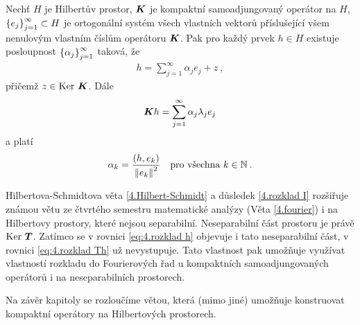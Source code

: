 \begin{corollary} \label{4.rozklad I}
Nechť $H$ je Hilbertův prostor, $\boldsymbol{K}$ je kompaktní samoadjungovaný operátor na $H$, $\left \lbrace e_j \right \rbrace_{j=1}^\infty \subset H$ je ortogonální systém všech vlastních vektorů příslušející všem nenulovým vlastním číslům operátoru $\boldsymbol{K}$. Pak pro každý prvek $h \in H$ existuje posloupnost $\left \lbrace \alpha_j \right \rbrace_{j=1}^\infty$ taková, že \begin{align} \label{eq:4.rozklad h}
    h = \sum_{j=1}^\infty \alpha_j e_j + z \:,
\end{align}
přičemž $z \in \operatorname{Ker}\, \boldsymbol{K}$. Dále \begin{align} \label{eq:4.rozklad Th}
    \boldsymbol{K} h = \sum_{j=1}^\infty \alpha_j \lambda_j e_j
\end{align}
a platí \begin{align*}
    \alpha_k = \dfrac{(h, e_k)}{\left\lVert e_k\right\rVert^2} \quad \text{pro všechna } k \in \mathbb{N} \:.
\end{align*}
\end{corollary}

\begin{remark}
Hilbertova-Schmidtova věta \ref{4.Hilbert-Schmidt} a důsledek \ref{4.rozklad I} rozšiřuje známou větu ze čtvrtého semestru matematické analýzy (Věta \ref{4.fourier}) i na Hilbertovy prostory, které nejsou separabilní. Neseparabilní část prostoru je právě $\operatorname{Ker}\, \boldsymbol{T}$. Zatímco se v rovnici \eqref{eq:4.rozklad h} objevuje i tato neseparabilní část, v rovnici \eqref{eq:4.rozklad Th} už nevystupuje. Tato vlastnost pak umožňuje využívat vlastností rozkladu do Fourierových řad u kompaktních samoadjungovaných operátorů i na neseparabilních prostorech.
\end{remark}

Na závěr kapitoly se rozloučíme větou, která (mimo jiné) umožňuje konstruovat kompaktní operátory na Hilbertových prostorech.

